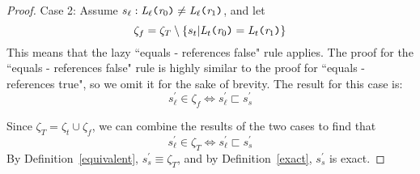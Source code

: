\begin{proof}
Case 2: Assume $s_\ell : \emph{L}_\ell \texttt{(} \emph{r}_0\texttt{)} \neq \emph{L}_\ell \texttt{(} \emph{r}_1 \texttt{)}$, and let 
$$\zeta_f = \zeta_T \setminus \{ s_t | \emph{L}_t \texttt{(} \emph{r}_0\texttt{)} = \emph{L}_t \texttt{(} \emph{r}_1 \texttt{)} \}$$ 
This means that the lazy ``equals - references false" rule applies. The proof for the ``equals - references false" rule is highly similar to the proof for ``equals - references true", so we omit it for the sake of brevity. The result for this case is:
$$s_\ell^\prime \in \zeta_f \Leftrightarrow s_\ell^\prime \sqsubset s_s^\prime$$

Since $\zeta_T = \zeta_t \cup \zeta_f$, we can combine the results of the two cases to find that 
$$s_\ell^\prime \in \zeta_T \Leftrightarrow s_\ell^\prime \sqsubset s_s^\prime$$
 By Definition~\ref{equivalent}, $s_s^\prime \equiv \zeta_T$, and by Definition~\ref{exact}, $s_s^\prime$ is exact.
\end{proof}

